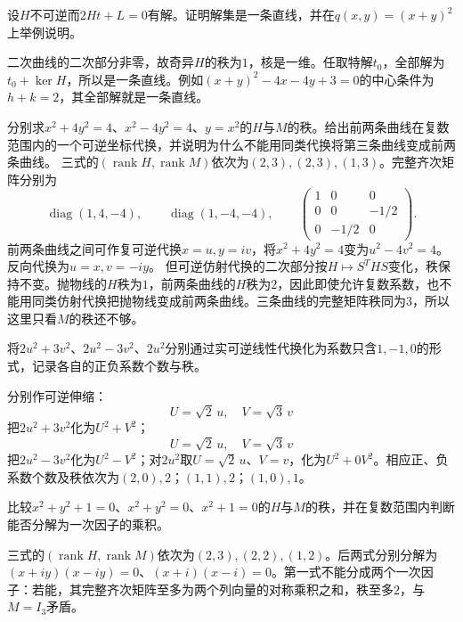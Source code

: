 设\(H\)不可逆而\(2Ht+L=0\)有解。证明解集是一条直线，并在\(q(x,y)=(x+y)^2\)上举例说明。
\par
\solutionanswer
二次曲线的二次部分非零，故奇异\(H\)的秩为\(1\)，核是一维。任取特解\(t_0\)，全部解为\(t_0+\ker H\)，所以是一条直线。例如\((x+y)^2-4x-4y+3=0\)的中心条件为\(h+k=2\)，其全部解就是一条直线。


分别求\(x^2+4y^2=4\)、\(x^2-4y^2=4\)、\(y=x^2\)的\(H\)与\(M\)的秩。给出前两条曲线在复数范围内的一个可逆坐标代换，并说明为什么不能用同类代换将第三条曲线变成前两条曲线。
\solutionanswer
三式的\((\operatorname{rank}H,\operatorname{rank}M)\)依次为\((2,3),(2,3),(1,3)\)。完整齐次矩阵分别为
\[
 \operatorname{diag}(1,4,-4),\qquad
 \operatorname{diag}(1,-4,-4),\qquad
 \begin{pmatrix}1&0&0\\0&0&-1/2\\0&-1/2&0\end{pmatrix}.
\]
前两条曲线之间可作复可逆代换\(x=u,y=iv\)，将\(x^2+4y^2=4\)变为\(u^2-4v^2=4\)。反向代换为\(u=x,v=-iy\)。
但可逆仿射代换的二次部分按\(H\mapsto S^THS\)变化，秩保持不变。抛物线的\(H\)秩为\(1\)，前两条曲线的\(H\)秩为\(2\)，因此即使允许复数系数，也不能用同类仿射代换把抛物线变成前两条曲线。三条曲线的完整矩阵秩同为\(3\)，所以这里只看\(M\)的秩还不够。


将\(2u^2+3v^2\)、\(2u^2-3v^2\)、\(2u^2\)分别通过实可逆线性代换化为系数只含\(1,-1,0\)的形式，记录各自的正负系数个数与秩。
\par
\solutionanswer
分别作可逆伸缩：
\[
U=\sqrt2\,u,\quad V=\sqrt3\,v
\]
把\(2u^2+3v^2\)化为\(U^2+V^2\)；
\[
U=\sqrt2\,u,\quad V=\sqrt3\,v
\]
把\(2u^2-3v^2\)化为\(U^2-V^2\)；对\(2u^2\)取\(U=\sqrt2\,u\)、\(V=v\)，化为\(U^2+0V^2\)。相应正、负系数个数及秩依次为\((2,0),2\)；\((1,1),2\)；\((1,0),1\)。


比较\(x^2+y^2+1=0\)、\(x^2+y^2=0\)、\(x^2+1=0\)的\(H\)与\(M\)的秩，并在复数范围内判断能否分解为一次因子的乘积。
\par
\solutionanswer
三式的\((\operatorname{rank}H,\operatorname{rank}M)\)依次为\((2,3),(2,2),(1,2)\)。后两式分别分解为\((x+iy)(x-iy)=0\)、\((x+i)(x-i)=0\)。第一式不能分成两个一次因子：若能，其完整齐次矩阵至多为两个列向量的对称乘积之和，秩至多\(2\)，与\(M=I_3\)矛盾。


